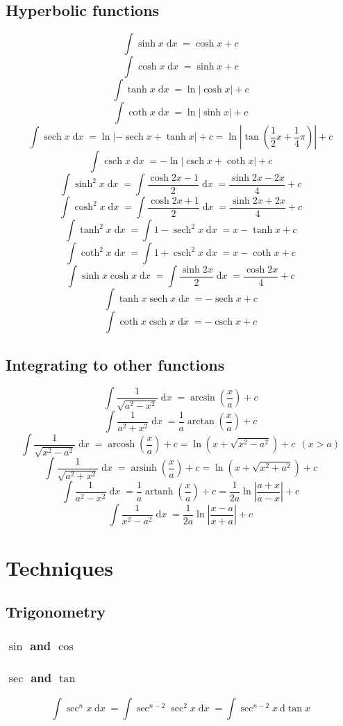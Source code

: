 \documentclass[fleqn, 11pt]{article}
\DeclareMathOperator\dx{\mathrm{d}\mathit{x}}
\DeclareMathOperator\sech{sech}
\DeclareMathOperator\csch{csch}
\DeclareMathOperator\arsinh{arsinh}
\DeclareMathOperator\arcosh{arcosh}
\DeclareMathOperator\artanh{artanh}
\begin{document}
	
	\subsection{Hyperbolic functions}
	\[\int\sinh x \dx = \cosh x + c\]
	\[\int\cosh x \dx = \sinh x + c\]
	\[\int \tanh x \dx = \ln |\cosh x| + c\]
	\[\int \coth x \dx = \ln |\sinh x| + c\]
	\[\int \sech x \dx = \ln |-\sech x + \tanh x| + c = \ln \left|\tan\left(\frac{1}{2}x+\frac{1}{4}\pi \right)\right| + c\]
	\[\int \csch x \dx = -\ln|\csch x + \coth x| + c\]
	\[\int \sinh^2 x \dx = \int \frac{\cosh 2x - 1}{2} \dx = \frac{\sinh 2x - 2x}{4} + c\]
	\[\int \cosh^2 x \dx = \int \frac{\cosh 2x + 1}{2} \dx = \frac{\sinh 2x + 2x}{4} + c\]
	\[\int \tanh^2 x \dx = \int 1-\sech^2 x \dx = x - \tanh x + c\]
	\[\int \coth^2 x \dx = \int 1+\csch^2 x \dx = x - \coth x + c\]
	\[\int \sinh x \cosh x \dx = \int \frac{\sinh 2x}{2} \dx = \dfrac{\cosh 2x}{4} + c\]
	\[\int \tanh x \sech x \dx = -\sech x + c\]
	\[\int \coth x \csch x \dx = -\csch x + c\]
	
	
	
	\subsection{Integrating to other functions}
	\[\int \frac{1}{\sqrt{a^2-x^2}} \dx=\arcsin \left(\frac{x}{a}\right) + c \]
	\[\int \frac{1}{a^2+x^2} \dx= \frac{1}{a}\arctan \left(\frac{x}{a}\right) + c \]
	\[\int \frac{1}{\sqrt{x^2-a^2}} \dx= \arcosh \left(\frac{x}{a}\right) + c = \ln \left(x + \sqrt{x^2-a^2}\right) + c \:\:  (x>a)\]
	\[\int \frac{1}{\sqrt{a^2+x^2}} \dx= \arsinh \left(\frac{x}{a}\right) + c = \ln \left(x + \sqrt{x^2+a^2}\right) + c \]
	\[\int \frac{1}{a^2-x^2} \dx=\frac{1}{a}\artanh \left(\frac{x}{a}\right) + c = \frac{1}{2a}\ln \left|\frac{a+x}{a-x}\right| + c\]
	\[\int \frac{1}{x^2-a^2} \dx= \frac{1}{2a}\ln \left|\frac{x-a}{x+a}\right| + c\]
	
	\pagebreak
	
	\section{Techniques}
	\subsection{Trigonometry}
	\subsubsection{$\sin$ and $\cos$}
	
	
	\subsubsection{$\sec$ and $\tan$}
	\[\int \sec^n x \dx = \int \sec^{n-2} \sec^2 x \dx = \int \sec^{n-2} x \: \mathrm{d} \tan x\]
	
	
\end{document}
